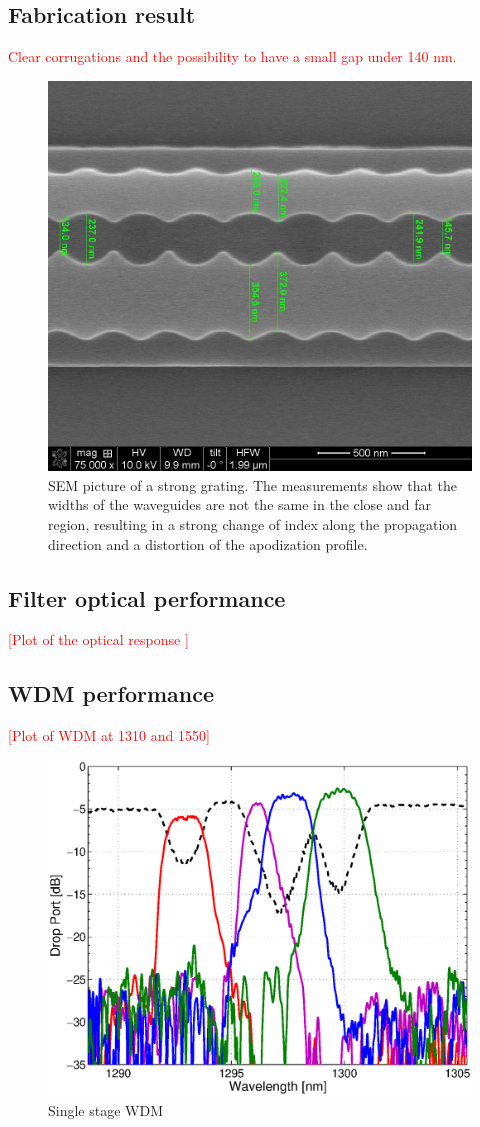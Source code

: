 \documentclass[letterpaper,10pt]{article}
\newcommand\todo[1]{\textcolor{red}{#1}}
\begin{document}
\subsection{Fabrication result}
\todo{Clear corrugations and the possibility to have a small gap under 140 nm.}
\begin{figure}[htbp]
	\centering
	\includegraphics[width=.60\columnwidth]{1310_P36_g190maybe}
	\caption{SEM picture of a strong grating. The measurements show that the widths of the waveguides are not the same in the close and far region, resulting in a strong change of index along the propagation direction and a distortion of the apodization profile. }
	\label{fig:litho}
\end{figure}

\subsection{Filter optical performance}
\todo{[Plot of the optical response ]}

\subsection{WDM performance}
\todo{[Plot of WDM at 1310 and 1550]}
\begin{figure}[htbp]
	\centering
	\includegraphics[width=.60\columnwidth]{Single_jsyLAN1310Sch4P12p259g190a10wt360wb220}
	\caption{Single stage WDM }
	\label{fig:litho}
\end{figure}
\end{document}
